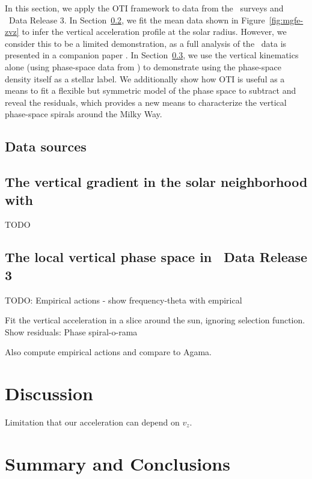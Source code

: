 In this section, we apply the OTI framework to data from the \apogee\ surveys and \gaia\
Data Release 3.
In Section~\ref{sec:apogee}, we fit the mean  data shown in
Figure~\ref{fig:mgfe-zvz} to infer the vertical acceleration profile at the solar
radius.
However, we consider this to be a limited demonstration, as a full analysis of the
\apogee\ data is presented in a companion paper \citep{Horta:2023}.
In Section~\ref{sec:gaiadr3}, we use the vertical kinematics alone (using phase-space
data from \gaia) to demonstrate using the phase-space density itself as a stellar label.
We additionally show how OTI is useful as a means to fit a flexible but symmetric model
of the phase space to subtract and reveal the residuals, which provides a new means to
characterize the vertical phase-space spirals around the Milky Way.

\subsection{Data sources} \label{sec:data}



\subsection{The vertical  gradient in the solar neighborhood with \apogee}
\label{sec:apogee}

TODO


\subsection{The local vertical phase space in \gaia\ Data Release 3}
\label{sec:gaiadr3}

TODO: Empirical actions - show frequency-theta with empirical

Fit the vertical acceleration in a slice around the sun, ignoring selection function.
Show residuals: Phase spiral-o-rama

Also compute empirical actions and compare to Agama.


\section{Discussion} \label{sec:discussion}

Limitation that our acceleration can depend on $v_z$.




\section{Summary and Conclusions} \label{sec:conclusions}


